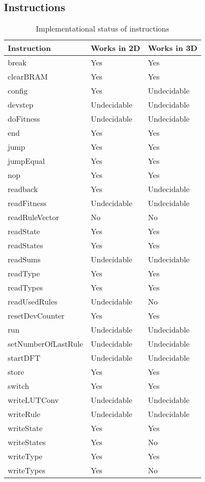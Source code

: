 
\subsection{Instructions}

\begin{table}[!ht]
    \renewcommand{\arraystretch}{1.3}
    \caption{Implementational status of instructions}
    \label{tab:instructions}
    \centering
    \begin{tabular}{l|l|l}
        \bfseries Instruction & \bfseries Works in 2D & \bfseries Works in 3D \\
        \hline
        break & Yes & Yes \\
        clearBRAM & Yes & Yes \\
        config & Yes & Undecidable \\
        devstep & Undecidable & Undecidable \\
        doFitness & Undecidable & Undecidable \\
        end & Yes & Yes \\
        jump & Yes & Yes \\
        jumpEqual & Yes & Yes \\
        nop & Yes & Yes \\
        readback & Yes & Undecidable \\
        readFitness & Undecidable & Undecidable \\
        readRuleVector & No & No \\
        readState & Yes & Yes \\
        readStates & Yes & Yes \\
        readSums & Undecidable & Undecidable \\
        readType & Yes & Yes \\
        readTypes & Yes & Yes \\
        readUsedRules & Undecidable & No \\
        resetDevCounter & Yes & Yes \\
        run & Undecidable & Undecidable \\
        setNumberOfLastRule & Undecidable & Undecidable \\
        startDFT & Undecidable & Undecidable \\
        store & Yes & Yes \\
        switch & Yes & Yes \\
        writeLUTConv & Undecidable & Undecidable \\
        writeRule & Undecidable & Undecidable \\
        writeState & Yes & Yes \\
        writeStates & Yes & No \\
        writeType & Yes & Yes \\
        writeTypes & Yes & No \\
    \end{tabular}
\end{table}

